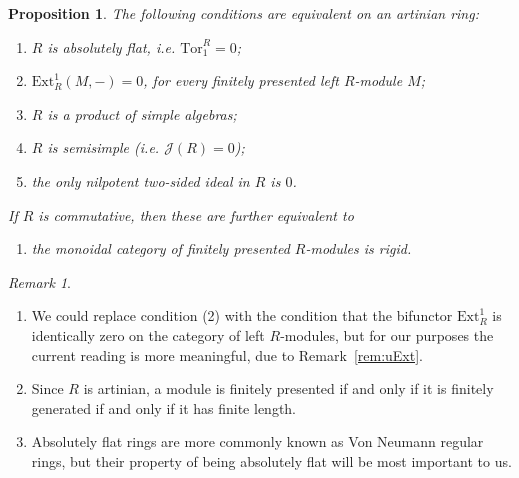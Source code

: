 \documentclass[11pt]{amsart}
\def\JJ{\mathcal{J}}
\def\Ext{\mathrm{Ext}}
\def\Tor{\mathrm{Tor}}
\newtheorem{prop}[thm]{Proposition}
\theoremstyle{definition}
\theoremstyle{remark}
\newtheorem{remark}[thm]{Remark}
\numberwithin{equation}{section}
\begin{document}
\begin{prop}\label{thm:ring}
    The following conditions are equivalent on an artinian ring:
    \begin{enumerate}
    \item  $R$ is absolutely flat, i.e. $\Tor_1^R=0$;
    \item $\Ext^1_R(M,-)=0$, for every finitely presented left $R$-module $M$;
    \item $R$ is a product of simple algebras; 
        \item $R$ is semisimple (i.e. $\JJ(R)=0$);
        \item the only nilpotent two-sided ideal in $R$ is $0$.
\end{enumerate}
If $R$ is commutative, then these are further equivalent to
        \begin{enumerate}
        \item[(1*)] the monoidal category of finitely presented $R$-modules is rigid.
        \end{enumerate}
\end{prop}

\begin{remark}
\begin{enumerate}
\item We could replace condition (2) with the condition that the bifunctor $\Ext^1_R$ is identically zero on the category of left $R$-modules, but for our purposes the current reading is more meaningful, due to Remark~\ref{rem:uExt}. 
    \item Since $R$ is artinian, a module is finitely presented if and only if it is finitely generated if and only if it has finite length.
    \item Absolutely flat rings are more commonly known as Von Neumann regular rings, but their property of being absolutely flat will be most important to us. 
\end{enumerate}
    
\end{remark}
\end{document}
